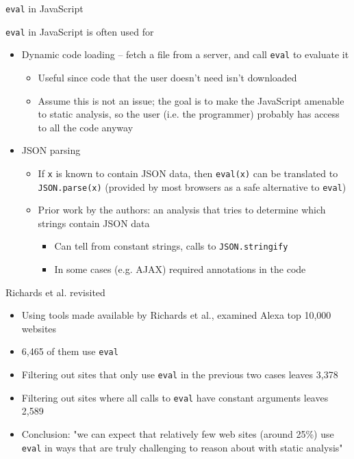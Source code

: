 \documentclass{beamer}
\begin{document}
\begin{frame}{{\tt eval} in JavaScript}

{\tt eval} in JavaScript is often used for
\begin{itemize}
\item Dynamic code loading -- fetch a file from a server, and call
{\tt eval} to evaluate it
\begin{itemize}
\item Useful since code that the user doesn't need isn't downloaded
\item Assume this is not an issue; the goal is to make the JavaScript
amenable to static analysis, so the user (i.e. the programmer) probably has
access to all the code anyway
\end{itemize}
\item JSON parsing
\begin{itemize}
\item If {\tt x} is known to contain JSON data, then {\tt eval(x)} can be
translated to {\tt JSON.parse(x)} (provided by most browsers as a safe
alternative to {\tt eval})
\item Prior work by the authors: an analysis that tries to
determine which strings contain JSON data
\begin{itemize}
\item Can tell from constant strings, calls to {\tt JSON.stringify}
\item In some cases (e.g. AJAX) required annotations in the code
\end{itemize}
\end{itemize}
\end{itemize}
\end{frame}

\begin{frame}{Richards et al. revisited}
\begin{itemize}
\item Using tools made available by Richards et al., examined Alexa top
10,000 websites
\item 6,465 of them use {\tt eval}
\item Filtering out sites that only use {\tt eval} in the previous two cases
leaves 3,378
\item Filtering out sites where all calls to {\tt eval} have constant
arguments leaves 2,589
\item Conclusion: "we can expect that relatively few web sites (around 25\%)
use {\tt eval} in ways that are truly challenging to reason about with
static analysis"
\end{itemize}
\end{frame}
\end{document}
